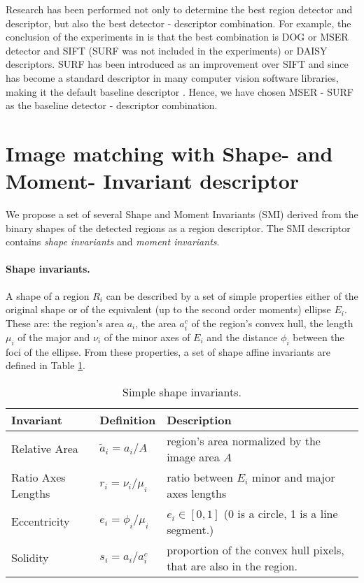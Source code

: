 \documentclass[a4paper,11pt]{article}
\begin{document}
Research has been performed not only to determine the best region detector and descriptor, but also the best detector - descriptor combination.
For example, the conclusion of the experiments in \cite{DahlAP11} is that the best combination is DOG or MSER detector and SIFT (SURF was not included in the experiments) or DAISY descriptors. SURF has been introduced as an improvement over SIFT and since has become a standard descriptor in many computer vision software libraries, making it the default baseline descriptor \cite{Bay2008}.
Hence, we have chosen MSER - SURF as the baseline detector - descriptor combination.

\section{Image matching with Shape- and Moment- Invariant descriptor}\label{sec:match}
We propose a set of several Shape and Moment Invariants (SMI) derived from the binary shapes of the detected regions as a region descriptor. The SMI descriptor contains {\em shape invariants} and {\em moment invariants}.

\paragraph{Shape invariants.}
A shape of a region $R_i$ can be described by a set of simple properties either of the original shape or of the equivalent (up to the second order moments) ellipse $E_i$. These are: the region's area $a_i$, the area  $a^c_i$ of the region's convex hull, the length  $\mu_i$ of the major and  $\nu_i$ of the minor axes of $E_i$ and the distance  $\phi_i$ between the foci of the ellipse. From these properties, a set of shape affine invariants are defined in Table \ref{tab:ssi}.   

\begin{table}[!ht]
\begin{center}
\begin{tabular}{|l||l|l|}
\hline
Invariant & Definition & Description\\
\hline
\hline
Relative Area & $\tilde{a}_i = {a_i}/{A}$ & region's area normalized by the image area $A$\\
\hline
Ratio Axes Lengths & $r_i = {\nu_i}/{\mu_i}$& ratio between $E_i$ minor and major axes lengths\\
\hline
Eccentricity &$e_i = \phi_i/\mu_i$& $e_i \in [0,1]$ (0 is a circle, 1 is a line segment.)\\
\hline
Solidity & $s_i = {a_i}/{a_i^c} $ & proportion of the convex hull pixels, that are also in the region. \\
\hline
\end{tabular}
\end{center}
\vspace{-20pt}
\caption{\small Simple shape invariants.} \label{tab:ssi}
  \vspace{-20pt}
\end{table}
\end{document}
